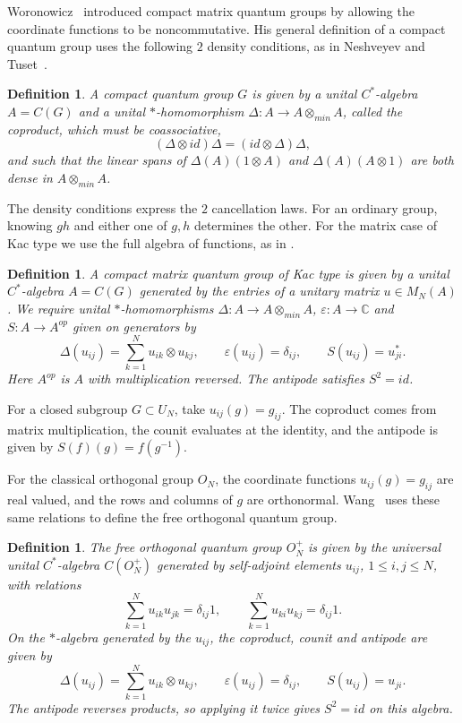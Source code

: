 \documentclass[11pt,a4paper]{article}
\newtheorem{defn}[thm]{Definition}
\begin{document}
Woronowicz~\cite{woro-cmp} introduced compact matrix quantum groups by allowing the coordinate functions to be noncommutative. His general definition of a compact quantum group uses the following $2$ density conditions, as in Neshveyev and Tuset~\cite{nt}.

\begin{samepage}
\begin{defn}
A compact quantum group $G$ is given by a unital $C^*$-algebra $A=C(G)$ and a unital $*$-homomorphism $\Delta:A\to A\otimes_{min}A$, called the coproduct, which must be coassociative,
\[
 (\Delta\otimes id)\Delta=(id\otimes\Delta)\Delta,
\]
and such that the linear spans of $\Delta(A)(1\otimes A)$ and $\Delta(A)(A\otimes1)$ are both dense in $A\otimes_{min}A$.
\end{defn}
\end{samepage}

The density conditions express the $2$ cancellation laws. For an ordinary group, knowing $gh$ and either one of $g,h$ determines the other. For the matrix case of Kac type we use the full algebra of functions, as in \cite{banica-book}.

\begin{samepage}
\begin{defn}
A compact matrix quantum group of Kac type is given by a unital $C^*$-algebra $A=C(G)$ generated by the entries of a unitary matrix $u\in M_N(A)$. We require unital $*$-homomorphisms $\Delta:A\to A\otimes_{min}A$, $\varepsilon:A\to\mathbb C$ and $S:A\to A^{op}$ given on generators by
\[
 \Delta(u_{ij})=\sum_{k=1}^N u_{ik}\otimes u_{kj},\qquad
 \varepsilon(u_{ij})=\delta_{ij},\qquad S(u_{ij})=u_{ji}^*.
\]
Here $A^{op}$ is $A$ with multiplication reversed. The antipode satisfies $S^2=id$.
\end{defn}
\end{samepage}

For a closed subgroup $G\subset U_N$, take $u_{ij}(g)=g_{ij}$. The coproduct comes from matrix multiplication, the counit evaluates at the identity, and the antipode is given by $S(f)(g)=f(g^{-1})$.

For the classical orthogonal group $O_N$, the coordinate functions $u_{ij}(g)=g_{ij}$ are real valued, and the rows and columns of $g$ are orthonormal. Wang~\cite{wang} uses these same relations to define the free orthogonal quantum group.

\begin{samepage}
\begin{defn}
The free orthogonal quantum group $O_N^+$ is given by the universal unital $C^*$-algebra $C(O_N^+)$ generated by self-adjoint elements $u_{ij}$, $1\leq i,j\leq N$, with relations
\[
 \sum_{k=1}^N u_{ik}u_{jk}=\delta_{ij}1,\qquad
 \sum_{k=1}^N u_{ki}u_{kj}=\delta_{ij}1 .
\]
On the $*$-algebra generated by the $u_{ij}$, the coproduct, counit and antipode are given by
\[
 \Delta(u_{ij})=\sum_{k=1}^N u_{ik}\otimes u_{kj},\qquad
 \varepsilon(u_{ij})=\delta_{ij},\qquad S(u_{ij})=u_{ji}.
\]
The antipode reverses products, so applying it twice gives $S^2=id$ on this algebra.
\end{defn}
\end{samepage}
\end{document}
